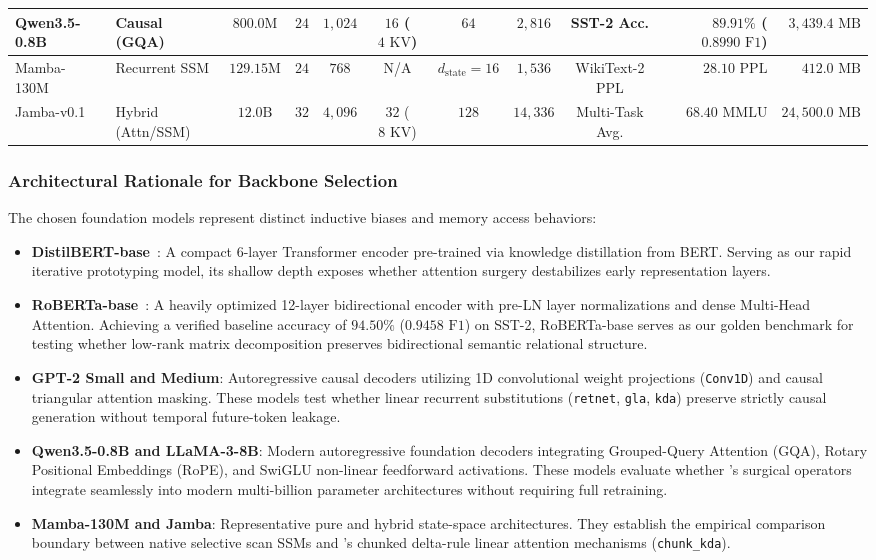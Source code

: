 \begin{table}[!t]
{\begin{tabular}{@{}llcccccccrr@{}}
Qwen3.5-0.8B~\cite{bai2023qwen} & Causal (GQA) & $800.0\text{M}$ & $24$ & $1{,}024$ & $16$ ($4\text{ KV}$) & $64$ & $2{,}816$ & SST-2 Acc. & $89.91\%$ ($0.8990\text{ F1}$) & $3{,}439.4\text{ MB}$ \\
\midrule
Mamba-130M~\cite{gu2022mamba} & Recurrent SSM & $129.15\text{M}$ & $24$ & $768$ & N/A & $d_{\text{state}}=16$ & $1{,}536$ & WikiText-2 PPL & $28.10\text{ PPL}$ & $412.0\text{ MB}$ \\
Jamba-v0.1~\cite{lieber2024jamba} & Hybrid (Attn/SSM) & $12.0\text{B}$ & $32$ & $4{,}096$ & $32$ ($8\text{ KV}$) & $128$ & $14{,}336$ & Multi-Task Avg. & $68.40\text{ MMLU}$ & $24{,}500.0\text{ MB}$ \\
\bottomrule
\end{tabular}%
}
\end{table}

\subsubsection{Architectural Rationale for Backbone Selection}
The chosen foundation models represent distinct inductive biases and memory access behaviors:
\begin{itemize}
    \item \textbf{DistilBERT-base}~\cite{sanh2019distilbert}: A compact 6-layer Transformer encoder pre-trained via knowledge distillation from BERT. Serving as our rapid iterative prototyping model, its shallow depth exposes whether attention surgery destabilizes early representation layers.
    \item \textbf{RoBERTa-base}~\cite{liu2019roberta}: A heavily optimized 12-layer bidirectional encoder with pre-LN layer normalizations and dense Multi-Head Attention. Achieving a verified baseline accuracy of $94.50\%$ ($0.9458\text{ F1}$) on SST-2, RoBERTa-base serves as our golden benchmark for testing whether low-rank matrix decomposition preserves bidirectional semantic relational structure.
    \item \textbf{GPT-2 Small and Medium}: Autoregressive causal decoders utilizing 1D convolutional weight projections (\texttt{Conv1D}) and causal triangular attention masking. These models test whether linear recurrent substitutions (\texttt{retnet}, \texttt{gla}, \texttt{kda}) preserve strictly causal generation without temporal future-token leakage.
    \item \textbf{Qwen3.5-0.8B and LLaMA-3-8B}: Modern autoregressive foundation decoders integrating Grouped-Query Attention (GQA), Rotary Positional Embeddings (RoPE), and SwiGLU non-linear feedforward activations. These models evaluate whether \neuralops{}'s surgical operators integrate seamlessly into modern multi-billion parameter architectures without requiring full retraining.
    \item \textbf{Mamba-130M and Jamba}: Representative pure and hybrid state-space architectures. They establish the empirical comparison boundary between native selective scan SSMs and \neuralops{}'s chunked delta-rule linear attention mechanisms (\texttt{chunk\_kda}).
\end{itemize}

